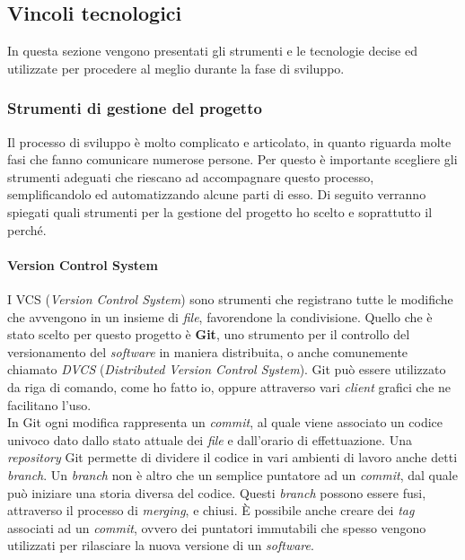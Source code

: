 
\subsection{Vincoli tecnologici}
In questa sezione vengono presentati gli strumenti e le tecnologie decise ed utilizzate per procedere al meglio durante la fase di sviluppo.

\subsubsection{Strumenti di gestione del progetto}
Il processo di sviluppo è molto complicato e articolato, in quanto riguarda molte fasi che fanno comunicare numerose persone. Per questo è importante scegliere gli strumenti adeguati che riescano ad accompagnare questo processo, semplificandolo ed automatizzando alcune parti di esso. Di seguito verranno spiegati quali strumenti per la gestione del progetto ho scelto e soprattutto il perché.

\paragraph{Version Control System}
I VCS (\textit{Version Control System}) sono strumenti che registrano tutte le modifiche che avvengono in un insieme di \textit{file}, favorendone la condivisione. Quello che è stato scelto per questo progetto è \textbf{Git}, uno strumento per il controllo del versionamento del \textit{software} in maniera distribuita, o anche comunemente chiamato \textit{DVCS} (\textit{Distributed Version Control System}). Git può essere utilizzato da riga di comando, come ho fatto io, oppure attraverso vari \textit{client} grafici che ne facilitano l'uso. \\

In Git ogni modifica rappresenta un \textit{commit}, al quale viene associato un codice univoco dato dallo stato attuale dei \textit{file} e dall'orario di effettuazione. Una \textit{repository} Git permette di dividere il codice in vari ambienti di lavoro anche detti \textit{branch}. Un \textit{branch} non è altro che un semplice puntatore ad un \textit{commit}, dal quale può iniziare una storia diversa del codice. Questi \textit{branch} possono essere fusi, attraverso il processo di \textit{merging}, e chiusi. È possibile anche creare dei \textit{tag} associati ad un \textit{commit}, ovvero dei puntatori immutabili che spesso vengono utilizzati per rilasciare la nuova versione di un \textit{software}. \\

